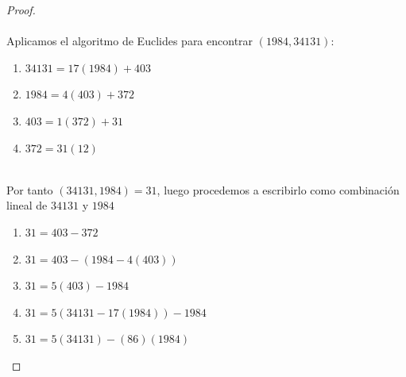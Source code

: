 \documentclass[11pt,letterpaper]{article}
\begin{document}
\begin{proof}\,\\
    \,\\
    Aplicamos el algoritmo de Euclides para encontrar $(1984,34131)$:\,\\
    \begin{enumerate}
        \item $34131=17(1984)+403$
        \item $1984=4(403)+372$
        \item $403=1(372)+31$
        \item $372=31(12)$
    \end{enumerate}\,\\
    Por tanto $(34131,1984)=31$, luego procedemos a escribirlo como combinaci\'on lineal de $34131$ y $1984$\,\\
    \begin{enumerate}
        \item $31=403-372$
        \item $31=403-(1984-4(403))$
        \item $31=5(403)-1984$
        \item $31=5(34131-17(1984))-1984$
        \item $31=5(34131)-(86)(1984)$
    \end{enumerate}
    
\end{proof}
\end{document}
